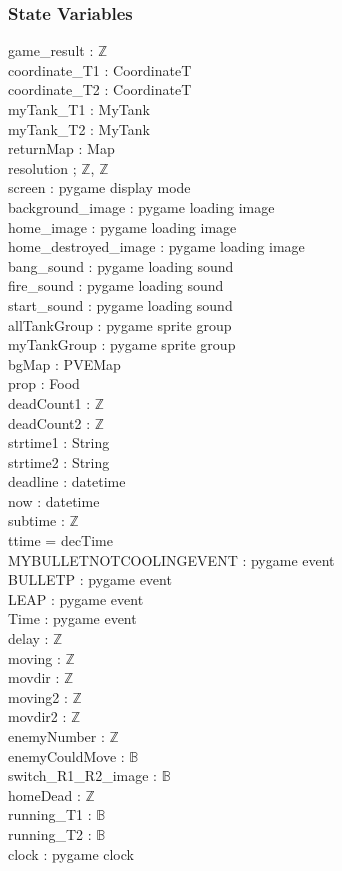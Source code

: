 \documentclass[12pt, titlepage]{article}
\begin{document}
		\subsubsection{State Variables}
		game\_result : $\mathbb{Z}$\\
		coordinate\_T1 : CoordinateT\\
		coordinate\_T2 : CoordinateT\\
		myTank\_T1 : MyTank\\
		myTank\_T2 : MyTank\\
		returnMap : Map\\
		resolution ; $\mathbb{Z}$, $\mathbb{Z}$\\
		screen : pygame display mode\\
		background\_image : pygame loading image\\
        home\_image : pygame loading image\\
        home\_destroyed\_image : pygame loading image\\
        bang\_sound : pygame loading sound\\
        fire\_sound : pygame loading sound\\
        start\_sound : pygame loading sound\\
        allTankGroup : pygame sprite group\\
        myTankGroup : pygame sprite group\\
        bgMap : PVEMap\\
        prop : Food\\
        deadCount1 : $\mathbb{Z}$\\
        deadCount2 : $\mathbb{Z}$\\
        strtime1 : String\\
        strtime2 : String\\
        deadline : datetime\\
        now : datetime\\
        subtime : $\mathbb{Z}$\\
        ttime = decTime\\
        MYBULLETNOTCOOLINGEVENT : pygame event\\
        BULLETP : pygame event\\
        LEAP : pygame event\\
        Time : pygame event\\
        delay : $\mathbb{Z}$\\
		moving : $\mathbb{Z}$\\
		movdir : $\mathbb{Z}$\\
		moving2 : $\mathbb{Z}$\\
		movdir2 : $\mathbb{Z}$\\
		enemyNumber : $\mathbb{Z}$\\
		enemyCouldMove : $\mathbb{B}$\\
		switch\_R1\_R2\_image : $\mathbb{B}$\\
		homeDead : $\mathbb{Z}$\\
		running\_T1 : $\mathbb{B}$\\
		running\_T2 : $\mathbb{B}$\\
		clock : pygame clock
		
\end{document}
